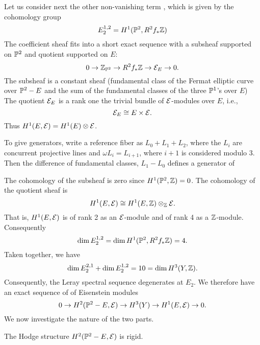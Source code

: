 \documentclass[11pt]{amsart}
\begin{document}
Let us consider next the other non-vanishing term , which is given by the cohomology group
\[
   E_2^{1,2} = H^1({\mathbb P}^2, R^2f_*{\mathbb Z})
\]
The coefficient sheaf  fits into a short exact sequence with a subsheaf  supported on ${\mathbb P}^2$
and quotient supported on $E$:
\begin{equation}
\label{r2sheafdec}
  0\to {\mathbb Z}_{{\mathbb P}^2}\to  R^2f_*{\mathbb Z} \to  {\mathcal E}_E\to 0.
\end{equation}
The subsheaf is a constant sheaf (fundamental class of the Fermat elliptic curve over ${\mathbb P}^2 -  E$ and the sum of the 
fundamental classes of the three ${\mathbb P}^1$'s over $E$)  The quotient  ${\mathcal E}_E$ is a 
rank one the trivial bundle of ${\mathcal E}$-modules over $E$,  i.e.,
\[ 
      {\mathcal E}_E \cong E\times{\mathcal E}.
\]
Thus $H^1(E, {\mathcal E}) = H^1(E)\otimes {\mathcal E}$.

To give generators, write a reference fiber as $L_0 + L_1 + L_2$, where the $L_i$ are concurrent projective lines
and $\omega L_i = L_{i+1}$, where $i + 1$ is considered modulo 3.  Then the difference of fundamental classes, $L_1 - L_0$
defines a generator of


The cohomology of the subsheaf is 
zero since $H^1({\mathbb P}^2,{\mathbb Z}) = 0$.  The cohomology of the quotient sheaf
is 
\begin{equation}
\label{H1:E:EEE}
  H^1(E,{\mathcal E}) \cong H^1(E,{\mathbb Z})\otimes_{\mathbb Z}{\mathcal E}.
\end{equation}
That is, $H^1(E,{\mathcal E})$ is of rank 2 as an ${\mathcal E}$-module and of
rank 4 as a ${\mathbb Z}$-module.
Consequently
\begin{equation}
\label{rankleray12}
 \dim E_2^{1,2} =   \dim H^1({\mathbb P}^2, R^2f_*{\mathbb Z}) = 4.
\end{equation}
Taken together, we have
\[ 
    \dim E_2^{2,1} + \dim E_2^{1,2}= 10 = \dim H^3(Y,{\mathbb Z}).
\]
Consequently, the Leray spectral sequence
degenerates at $E_2$.  We therefore have an exact sequence of 
of Eisenstein modules
\begin{equation}
\label{H3:decomp}
   0 \to H^2({\mathbb P}^2 - E, {\mathcal E}) \to H^3(Y) \to   H^1(E, {\mathcal E}) \to 0.
\end{equation} 
We now investigate the nature of the two parts.

\begin{lemma} 
The Hodge structure $H^2({\mathbb P}^2 - E, {\mathcal E})$ is rigid.
\end{lemma}
\end{document}
